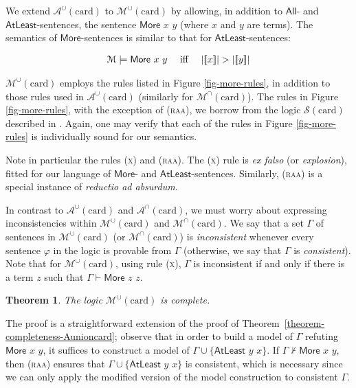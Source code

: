 \documentclass[letterpaper]{article}
\newtheorem{theorem}{Theorem}[section]
\theoremstyle{definition}
\newcommand{\semantics}[1]{[\![\mbox{\em $ #1 $\/}]\!]}
\newcommand{\Model}{\mathcal{M}}
\newcommand{\set}[1]{\{ #1 \}}
\newcommand{\proves}{\vdash}
\newcommand{\Aunion}{\mathscr{A}^{\cup}}
\newcommand{\Munion}{\mathscr{M}^{\cup}}
\newcommand{\Ainter}{\mathscr{A}^{\cap}}
\newcommand{\Minter}{\mathscr{M}^{\cap}}
\newcommand{\proverule}{\textsc}
\newcommand{\x}{\proverule{x}}
\newcommand{\raa}{\proverule{raa}}
\newcommand{\Atleast}[2]{\mathsf{AtLeast}\,\,#1\,\,#2}
\newcommand{\More}[2]{\mathsf{More}\,\,#1\,\,#2}
\newcommand{\AllNoArgs}{\mathsf{All}}
\newcommand{\AtleastNoArgs}{\mathsf{AtLeast}}
\newcommand{\MoreNoArgs}{\mathsf{More}}
\newcommand{\card}{\mathrm{card}}
\begin{document}
We extend $\Aunion(\card)$ to $\Munion(\card)$ by allowing, in addition to $\AllNoArgs$- and $\AtleastNoArgs$-sentences, the sentence $\More{x}{y}$ (where $x$ and $y$ are terms).  The semantics of $\MoreNoArgs$-sentences is similar to that for $\AtleastNoArgs$-sentences:

\[
\begin{array}{lclcl}
    \Model \models \More{x}{y} & \textrm{ iff } & 
        |\semantics{x}| > |\semantics{y}|
\end{array}
\] 



$\Munion(\card)$ employs the rules listed in Figure \ref{fig-more-rules}, in addition to those rules used in $\Aunion(\card)$ (similarly for $\Minter(\card)$).  The rules in Figure \ref{fig-more-rules}, with the exception of (\raa), we borrow from the logic $\mathscr{S}(\card)$ described in \cite{syllogistic_cardinality_comparisons}.  Again, one may verify that each of the rules in Figure \ref{fig-more-rules} is individually sound for our semantics.

Note in particular the rules (\x) and (\raa).  The (\x) rule is \emph{ex falso} (or \emph{explosion}), fitted for our language of $\MoreNoArgs$- and $\AtleastNoArgs$-sentences.  Similarly, (\raa) is a special instance of \emph{reductio ad absurdum}.

In contrast to $\Aunion(\card)$ and $\Ainter(\card)$, we must worry about expressing inconsistencies within $\Munion(\card)$ and $\Minter(\card)$.  We say that a set $\Gamma$ of sentences in $\Munion(\card)$ (or $\Minter(\card)$) is \emph{inconsistent} whenever every sentence $\varphi$ in the logic is provable from $\Gamma$ (otherwise, we say that $\Gamma$ is \emph{consistent}).  Note that for $\Munion(\card)$, using rule (\x), $\Gamma$ is inconsistent if and only if there is a term $z$ such that $\Gamma \proves \More{z}{z}$.

\begin{theorem}
The logic $\Munion(\card)$ is complete.
\label{theorem-completeness-Munioncard}
\end{theorem}

The proof is a straightforward extension of the proof of Theorem~\ref{theorem-completeness-Aunioncard}; observe that in order to build a model of $\Gamma$ refuting $\More{x}{y}$, it suffices to construct a model of $\Gamma \cup \set{\Atleast{y}{x}}$. If $\Gamma\not\vdash \More{x}{y}$, then (\raa) ensures that $\Gamma \cup \set{\Atleast{y}{x}}$ is consistent, which is necessary since we can only apply the modified version of the model construction to consistent $\Gamma$. %
\end{document}
